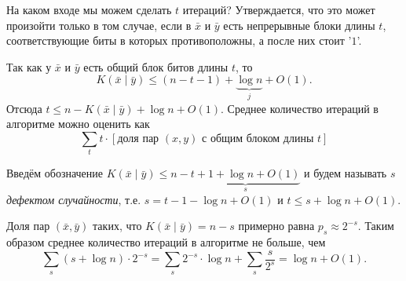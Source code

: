 \documentclass[12pt]{article}
\theoremstyle{definition}
\theoremstyle{plain}
\theoremstyle{remark}
\begin{document}
На каком входе мы можем сделать $t$ итераций? Утверждается, что это может произойти
только в том случае, если в $\bar x$ и $\bar y$
есть непрерывные блоки длины $t$, соответствующие биты в которых противоположны,
а после них стоит '$1$'.
\begin{center}
\end{center}

Так как у $\bar x$ и $\bar y$ есть общий блок битов длины $t$, то
\[
    K(\bar x\mid\bar y)\le (n-t-1) + \underbrace{\log n}_{j} + O(1).
\]
Отсюда $t\le n - K(\bar x\mid\bar y) + \log n + O(1).$ Среднее количество
итераций в алгоритме можно оценить как
\[
    \sum_t t\cdot [\text{доля пар $(x,y)$ с общим блоком длины $t$}]
\]

Введём обозначение
$K(\bar x\mid \bar y)\le n - \underbrace{t + 1 + \log n + O(1)}_{s}$ и будем
называть $s$ \emph{дефектом случайности}, т.е. $s = t - 1 - \log n + O(1)$ и
$t\le s + \log n + O(1)$.

Доля пар $(\bar x, \bar y)$ таких, что $K(\bar x\mid \bar y) = n - s$
примерно равна $p_s\approx 2^{-s}$. Таким образом среднее количество итераций в
алгоритме не больше, чем
\[
    \sum_s (s + \log n)\cdot 2^{-s} = \sum_s 2^{-s}\cdot\log n + \sum_s \frac{s}{2^s}
    = \log n + O(1).
\]
\end{document}

